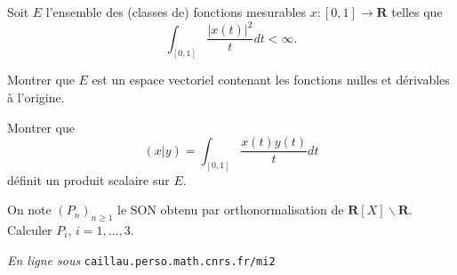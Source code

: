 \documentclass[11pt,a4paper]{article}
\def\R{\mathbf{R}}
\def\iy{\infty}
\begin{document}
\newpage
\begin{Exercice} Soit $E$ l'ensemble des (classes de) fonctions
mesurables $x:[0,1] \to \R$ telles que
$$ \int_{[0,1]} \frac{|x(t)|^2}{t}dt < \iy. $$

\begin{Question} Montrer que $E$ est un espace vectoriel
contenant les fonctions nulles et d\'erivables \`a l'origine.
\end{Question}

\begin{Question} Montrer que
$$ (x|y) = \int_{[0,1]} \frac{x(t)y(t)}{t}dt $$
d\'efinit un produit scalaire sur $E$. \end{Question}

\begin{Question} On note $(P_n)_{n \geq 1}$ le SON obtenu par
orthonormalisation de $\R[X] \backslash \R$. Calculer $P_i$,
$i=1,\dots,3$. \end{Question}
\end{Exercice} \vspace*{1em}

\vfill \begin{flushright}{\footnotesize \emph{En ligne sous}
\texttt{caillau.perso.math.cnrs.fr/mi2}} \end{flushright}
\end{document}
